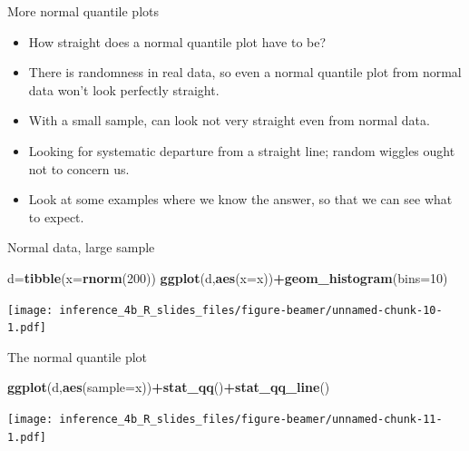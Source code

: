 \documentclass[
  ignorenonframetext,
]{beamer}
\newenvironment{Shaded}{\begin{snugshade}}{\end{snugshade}}
\newcommand{\DataTypeTok}[1]{\textcolor[rgb]{0.13,0.29,0.53}{#1}}
\newcommand{\DecValTok}[1]{\textcolor[rgb]{0.00,0.00,0.81}{#1}}
\newcommand{\KeywordTok}[1]{\textcolor[rgb]{0.13,0.29,0.53}{\textbf{#1}}}
\newcommand{\NormalTok}[1]{#1}
\newcommand{\OperatorTok}[1]{\textcolor[rgb]{0.81,0.36,0.00}{\textbf{#1}}}
\providecommand{\tightlist}{%
  \setlength{\itemsep}{0pt}\setlength{\parskip}{0pt}}
\begin{document}
\begin{frame}{More normal quantile plots}
\protect\hypertarget{more-normal-quantile-plots}{}
\begin{itemize}
\tightlist
\item
  How straight does a normal quantile plot have to be?
\item
  There is randomness in real data, so even a normal quantile plot from
  normal data won't look perfectly straight.
\item
  With a small sample, can look not very straight even from normal data.
\item
  Looking for systematic departure from a straight line; random wiggles
  ought not to concern us.
\item
  Look at some examples where we know the answer, so that we can see
  what to expect.
\end{itemize}
\end{frame}

\begin{frame}[fragile]{Normal data, large sample}
\protect\hypertarget{normal-data-large-sample}{}
\begin{Shaded}
\begin{Highlighting}[]
\NormalTok{d=}\KeywordTok{tibble}\NormalTok{(}\DataTypeTok{x=}\KeywordTok{rnorm}\NormalTok{(}\DecValTok{200}\NormalTok{))}
\KeywordTok{ggplot}\NormalTok{(d,}\KeywordTok{aes}\NormalTok{(}\DataTypeTok{x=}\NormalTok{x))}\OperatorTok{+}\KeywordTok{geom\_histogram}\NormalTok{(}\DataTypeTok{bins=}\DecValTok{10}\NormalTok{)}
\end{Highlighting}
\end{Shaded}

\texttt{[image: inference\_4b\_R\_slides\_files/figure-beamer/unnamed-chunk-10-1.pdf]}
\end{frame}

\begin{frame}[fragile]{The normal quantile plot}
\protect\hypertarget{the-normal-quantile-plot-1}{}
\begin{Shaded}
\begin{Highlighting}[]
\KeywordTok{ggplot}\NormalTok{(d,}\KeywordTok{aes}\NormalTok{(}\DataTypeTok{sample=}\NormalTok{x))}\OperatorTok{+}\KeywordTok{stat\_qq}\NormalTok{()}\OperatorTok{+}\KeywordTok{stat\_qq\_line}\NormalTok{()}
\end{Highlighting}
\end{Shaded}

\texttt{[image: inference\_4b\_R\_slides\_files/figure-beamer/unnamed-chunk-11-1.pdf]}
\end{frame}
\end{document}
